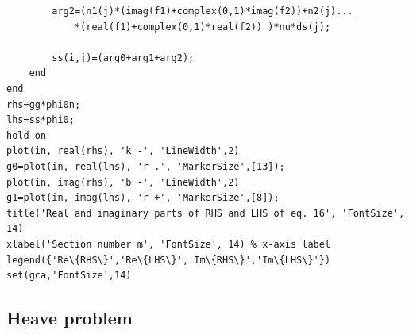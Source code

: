 \documentclass[a4paper,10pt]{article}
\begin{document}
\begin{verbatim}
        arg2=(n1(j)*(imag(f1)+complex(0,1)*imag(f2))+n2(j)...
            *(real(f1)+complex(0,1)*real(f2)) )*nu*ds(j);

        ss(i,j)=(arg0+arg1+arg2);
    end
end
rhs=gg*phi0n;
lhs=ss*phi0;
hold on
plot(in, real(rhs), 'k -', 'LineWidth',2)
g0=plot(in, real(lhs), 'r .', 'MarkerSize',[13]);
plot(in, imag(rhs), 'b -', 'LineWidth',2)
g1=plot(in, imag(lhs), 'r +', 'MarkerSize',[8]);
title('Real and imaginary parts of RHS and LHS of eq. 16', 'FontSize', 14)
xlabel('Section number m', 'FontSize', 14) % x-axis label
legend({'Re\{RHS\}','Re\{LHS\}','Im\{RHS\}','Im\{LHS\}'})
set(gca,'FontSize',14)
\end{verbatim}

\subsection{Heave problem}
\end{document}
